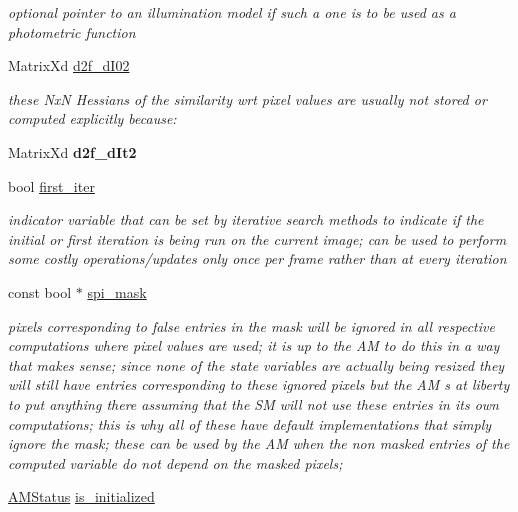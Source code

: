 \begin{DoxyCompactItemize}
\begin{DoxyCompactList}\small\item\em optional pointer to an illumination model if such a one is to be used as a photometric function \end{DoxyCompactList}\item 
Matrix\-Xd \hyperlink{classAppearanceModel_a398fcc79cc79b42ecc789084dd1a4b8a}{d2f\-\_\-d\-I02}
\begin{DoxyCompactList}\small\item\em these Nx\-N Hessians of the similarity wrt pixel values are usually not stored or computed explicitly because\-: \end{DoxyCompactList}\item 
\hypertarget{classAppearanceModel_a4cec79393618e73d25ae792321b644e9}{Matrix\-Xd {\bfseries d2f\-\_\-d\-It2}}\label{classAppearanceModel_a4cec79393618e73d25ae792321b644e9}

\item 
\hypertarget{classAppearanceModel_a6c4a7dba13c25b93c7a206b9470ecc27}{bool \hyperlink{classAppearanceModel_a6c4a7dba13c25b93c7a206b9470ecc27}{first\-\_\-iter}}\label{classAppearanceModel_a6c4a7dba13c25b93c7a206b9470ecc27}

\begin{DoxyCompactList}\small\item\em indicator variable that can be set by iterative search methods to indicate if the initial or first iteration is being run on the current image; can be used to perform some costly operations/updates only once per frame rather than at every iteration \end{DoxyCompactList}\item 
\hypertarget{classAppearanceModel_a9c9b2b8f54d5ced8a9df46024905fd26}{const bool $\ast$ \hyperlink{classAppearanceModel_a9c9b2b8f54d5ced8a9df46024905fd26}{spi\-\_\-mask}}\label{classAppearanceModel_a9c9b2b8f54d5ced8a9df46024905fd26}

\begin{DoxyCompactList}\small\item\em pixels corresponding to false entries in the mask will be ignored in all respective computations where pixel values are used; it is up to the A\-M to do this in a way that makes sense; since none of the state variables are actually being resized they will still have entries corresponding to these ignored pixels but the A\-M s at liberty to put anything there assuming that the S\-M will not use these entries in its own computations; this is why all of these have default implementations that simply ignore the mask; these can be used by the A\-M when the non masked entries of the computed variable do not depend on the masked pixels; \end{DoxyCompactList}\item 
\hypertarget{classAppearanceModel_a707335501e3dd58d0d125588e2842107}{\hyperlink{structAMStatus}{A\-M\-Status} \hyperlink{classAppearanceModel_a707335501e3dd58d0d125588e2842107}{is\-\_\-initialized}}\label{classAppearanceModel_a707335501e3dd58d0d125588e2842107}


\end{DoxyCompactItemize}
